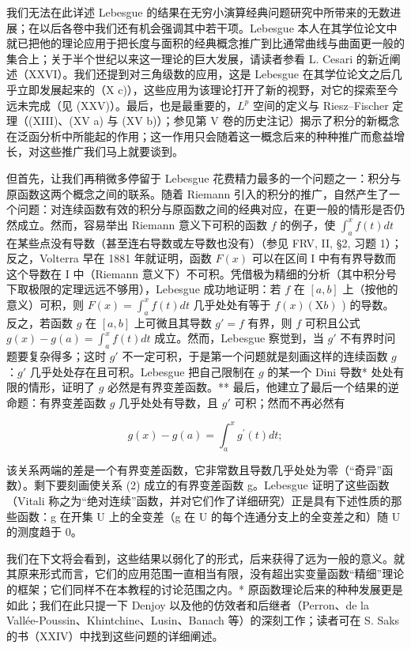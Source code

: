 我们无法在此详述 Lebesgue 的结果在无穷小演算经典问题研究中所带来的无数进展；在以后各卷中我们还有机会强调其中若干项。Lebesgue 本人在其学位论文中就已把他的理论应用于把长度与面积的经典概念推广到比通常曲线与曲面更一般的集合上；关于半个世纪以来这一理论的巨大发展，请读者参看 L. Cesari 的新近阐述（XXVI）。我们还提到对三角级数的应用，这是 Lebesgue 在其学位论文之后几乎立即发展起来的（X c)），这些应用为该理论打开了新的视野，对它的探索至今远未完成（见 (XXV)）。最后，也是最重要的，\(L^{p}\) 空间的定义与 Riesz--Fischer 定理（(XIII)、(XV a) 与 (XV b)）；参见第 V 卷的历史注记）揭示了积分的新概念在泛函分析中所能起的作用；这一作用只会随着这一概念后来的种种推广而愈益增长，对这些推广我们马上就要谈到。

但首先，让我们再稍微多停留于 Lebesgue 花费精力最多的一个问题之一：积分与原函数这两个概念之间的联系。随着 Riemann 引入的积分的推广，自然产生了一个问题：对连续函数有效的积分与原函数之间的经典对应，在更一般的情形是否仍然成立。然而，容易举出 Riemann 意义下可积的函数 \(f\) 的例子，使 \(\int_{a}^{x} f(t) dt\) 在某些点没有导数（甚至连右导数或左导数也没有）（参见 FRV, II, §2, 习题 1）；反之，Volterra 早在 1881 年就证明，函数 \(F(x)\) 可以在区间 I 中有有界导数而这个导数在 I 中（Riemann 意义下）不可积。凭借极为精细的分析（其中积分号下取极限的定理远远不够用），Lebesgue 成功地证明：若 \(f\) 在 \([a, b]\) 上（按他的意义）可积，则 \(F(x) = \int_{a}^{x} f(t) dt\) 几乎处处有等于 \(f(x) (\mathrm{X}b)\) ) 的导数。反之，若函数 \(g\) 在 \([a, b]\) 上可微且其导数 \(g' = f\) 有界，则 \(f\) 可积且公式 \(g(x) - g(a) = \int_{a}^{x} f(t) dt\) 成立。然而，Lebesgue 察觉到，当 \(g'\) 不有界时问题要复杂得多；这时 \(g'\) 不一定可积，于是第一个问题就是刻画这样的连续函数 \(g\)：\(g'\) 几乎处处存在且可积。Lebesgue 把自己限制在 \(g\) 的某一个 Dini 导数* 处处有限的情形，证明了 \(g\) 必然是有界变差函数。** 最后，他建立了最后一个结果的逆命题：有界变差函数 \(g\) 几乎处处有导数，且 \(g'\) 可积；然而不再必然有

\[
g (x) - g (a) = \int_ {a} ^ {x} g ^ {\prime} (t) d t;\tag{2}
\]

该关系两端的差是一个有界变差函数，它非常数且导数几乎处处为零（“奇异”函数）。剩下要刻画使关系 (2) 成立的有界变差函数 g。Lebesgue 证明了这些函数（Vitali 称之为“绝对连续”函数，并对它们作了详细研究）正是具有下述性质的那些函数：g 在开集 U 上的全变差（g 在 U 的每个连通分支上的全变差之和）随 U 的测度趋于 0。

我们在下文将会看到，这些结果以弱化了的形式，后来获得了远为一般的意义。就其原来形式而言，它们的应用范围一直相当有限，没有超出实变量函数“精细”理论的框架；它们同样不在本教程的讨论范围之内。* 原函数理论后来的种种发展更是如此；我们在此只提一下 Denjoy 以及他的仿效者和后继者（Perron、de la Vallée-Poussin、Khintchine、Lusin、Banach 等）的深刻工作；读者可在 S. Saks 的书（XXIV）中找到这些问题的详细阐述。


